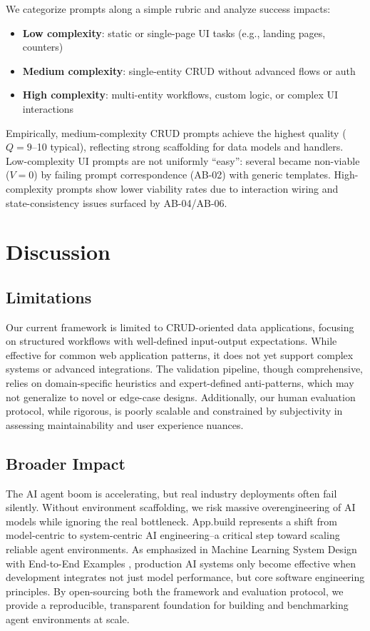 \documentclass{article}
\begin{document}
We categorize prompts along a simple rubric and analyze success impacts:

\begin{itemize}
\item \textbf{Low complexity}: static or single-page UI tasks (e.g., landing pages, counters)
\item \textbf{Medium complexity}: single-entity CRUD without advanced flows or auth
\item \textbf{High complexity}: multi-entity workflows, custom logic, or complex UI interactions
\end{itemize}

Empirically, medium-complexity CRUD prompts achieve the highest quality ($Q=9$--10 typical), reflecting strong scaffolding for data models and handlers. Low-complexity UI prompts are not uniformly ``easy'': several became non-viable ($V=0$) by failing prompt correspondence (AB-02) with generic templates. High-complexity prompts show lower viability rates due to interaction wiring and state-consistency issues surfaced by AB-04/AB-06.

\section{Discussion}

\subsection{Limitations}

Our current framework is limited to CRUD-oriented data applications, focusing on structured workflows with well-defined input-output expectations. While effective for common web application patterns, it does not yet support complex systems or advanced integrations. The validation pipeline, though comprehensive, relies on domain-specific heuristics and expert-defined anti-patterns, which may not generalize to novel or edge-case designs. Additionally, our human evaluation protocol, while rigorous, is poorly scalable and constrained by subjectivity in assessing maintainability and user experience nuances.

\subsection{Broader Impact}

The AI agent boom is accelerating, but real industry deployments often fail silently. Without environment scaffolding, we risk massive overengineering of AI models while ignoring the real bottleneck. App.build represents a shift from model-centric to system-centric AI engineering--a critical step toward scaling reliable agent environments. As emphasized in Machine Learning System Design with End-to-End Examples \citep{babushkin2025machine}, production AI systems only become effective when development integrates not just model performance, but core software engineering principles. By open-sourcing both the framework and evaluation protocol, we provide a reproducible, transparent foundation for building and benchmarking agent environments at scale.
\end{document}
